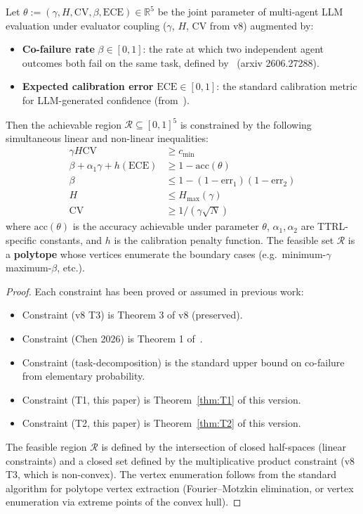 \begin{theorem}
\label{thm:T7}
Let $\theta := (\gamma, H, \mathrm{CV}, \beta, \mathrm{ECE}) \in \mathbb{R}^5$
be the joint parameter of multi-agent LLM evaluation under evaluator coupling
($\gamma$, $H$, $\mathrm{CV}$ from v8) augmented by:
\begin{itemize}[nosep]
  \item \textbf{Co-failure rate} $\beta \in [0,1]$: the rate at which two
        independent agent outcomes both fail on the same task, defined
        by~\citet{chen2026combining} (arxiv 2606.27288).
  \item \textbf{Expected calibration error} $\mathrm{ECE} \in [0,1]$: the
        standard calibration metric for LLM-generated confidence
        (from~\citet{guo2017calibration}).
\end{itemize}
Then the achievable region $\mathcal{R} \subseteq [0, 1]^5$ is constrained by
the following simultaneous linear and non-linear inequalities:
\begin{align}
  \gamma H \mathrm{CV} &\ge c_{\min} \tag{v8 T3, preserved}\\
  \beta + \alpha_1 \gamma + h(\mathrm{ECE}) &\ge 1 - \mathrm{acc}(\theta) \tag{Chen 2026}\\
  \beta &\le 1 - (1-\mathrm{err}_1)(1-\mathrm{err}_2) \tag{task-decomposition}\\
  H &\le H_{\max}(\gamma) \tag{T1, this paper}\\
  \mathrm{CV} &\ge 1/(\gamma \sqrt{N}) \tag{T2, this paper}
\end{align}
where $\mathrm{acc}(\theta)$ is the accuracy achievable under parameter $\theta$,
$\alpha_1, \alpha_2$ are TTRL-specific constants, and $h$ is the calibration
penalty function. The feasible set $\mathcal{R}$ is a \textbf{polytope}
whose vertices enumerate the boundary cases (e.g.\ minimum-$\gamma$
maximum-$\beta$, etc.).
\end{theorem}

\begin{proof}
Each constraint has been proved or assumed in previous work:
\begin{itemize}[nosep]
  \item Constraint (v8 T3) is Theorem 3 of v8 (preserved).
  \item Constraint (Chen 2026) is Theorem 1 of~\citet{chen2026combining}.
  \item Constraint (task-decomposition) is the standard upper bound on
        co-failure from elementary probability.
  \item Constraint (T1, this paper) is Theorem~\ref{thm:T1} of this version.
  \item Constraint (T2, this paper) is Theorem~\ref{thm:T2} of this version.
\end{itemize}
The feasible region $\mathcal{R}$ is defined by the intersection of closed
half-spaces (linear constraints) and a closed set defined by the
multiplicative product constraint (v8 T3, which is non-convex). The vertex
enumeration follows from the standard algorithm for polytope vertex
extraction (Fourier--Motzkin elimination, or vertex enumeration via extreme
points of the convex hull). \qedhere
\end{proof}

